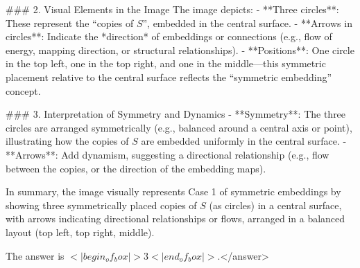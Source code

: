 ### 2. Visual Elements in the Image  
The image depicts:  
- **Three circles**: These represent the “copies of \( S \)”, embedded in the central surface.  
- **Arrows in circles**: Indicate the *direction* of embeddings or connections (e.g., flow of energy, mapping direction, or structural relationships).  
- **Positions**: One circle in the top left, one in the top right, and one in the middle—this symmetric placement relative to the central surface reflects the “symmetric embedding” concept.  


### 3. Interpretation of Symmetry and Dynamics  
- **Symmetry**: The three circles are arranged symmetrically (e.g., balanced around a central axis or point), illustrating how the copies of \( S \) are embedded uniformly in the central surface.  
- **Arrows**: Add dynamism, suggesting a directional relationship (e.g., flow between the copies, or the direction of the embedding maps).  


In summary, the image visually represents Case 1 of symmetric embeddings by showing three symmetrically placed copies of \( S \) (as circles) in a central surface, with arrows indicating directional relationships or flows, arranged in a balanced layout (top left, top right, middle).  

The answer is \(<|begin_of_box|>3<|end_of_box|>\).</answer>